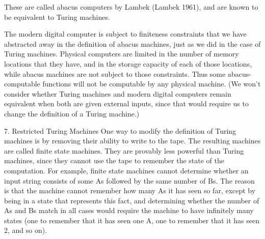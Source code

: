 These are called abacus computers by Lambek (Lambek 1961), and are known to be equivalent to Turing machines.

The modern digital computer is subject to finiteness constraints that we have abstracted away in the definition of abacus machines, just as we did in the case of Turing machines. Physical computers are limited in the number of memory locations that they have, and in the storage capacity of each of those locations, while abacus machines are not subject to those constraints. Thus some abacus-computable functions will not be computable by any physical machine. (We won't consider whether Turing machines and modern digital computers remain equivalent when both are given external inputs, since that would require us to change the definition of a Turing machine.)

7. Restricted Turing Machines
One way to modify the definition of Turing machines is by removing their ability to write to the tape. The resulting machines are called finite state machines. They are provably less powerful than Turing machines, since they cannot use the tape to remember the state of the computation. For example, finite state machines cannot determine whether an input string consists of some As followed by the same number of Bs. The reason is that the machine cannot remember how many As it has seen so far, except by being in a state that represents this fact, and determining whether the number of As and Bs match in all cases would require the machine to have infinitely many states (one to remember that it has seen one A, one to remember that it has seen 2, and so on).

